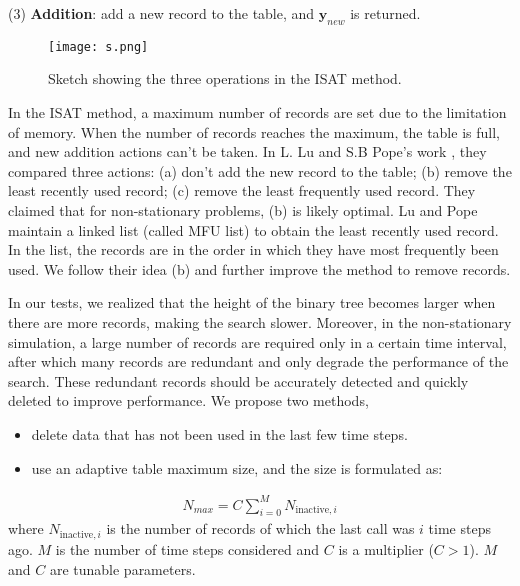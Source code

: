 (3) \textbf{Addition}: add a new record to the table, and $\mathbf{y}_{new}$ is returned.

\begin{figure}[htbp]
	\centering
	\texttt{[image: s.png]}
	\caption{Sketch showing the three operations in the ISAT method.}
	\label{ISAT_ALG}
\end{figure}

In the ISAT method, a maximum number of records are set due to the limitation of memory. When the number of records reaches the maximum, the table is full, and new addition actions can't be taken. In L. Lu and S.B Pope's work \cite{lu2009improved}, they compared three actions: (a) don't add the new record to the table; (b) remove the least recently used record; (c) remove the least frequently used record. They claimed that for non-stationary problems, (b) is likely optimal. Lu and Pope~\cite{lu2009improved}  maintain a linked list (called MFU list) to obtain the least recently used record. In the list, the records are in the order in which they have most frequently been used. We follow their idea (b) and further improve the method to remove records.

In our tests, we realized that the height of the binary tree becomes larger when there are more records, making the search slower. Moreover, in the non-stationary simulation, a large number of records are required only in a certain time interval, after which many records are redundant and only degrade the performance of the search. These redundant records should be accurately detected and quickly deleted to improve performance. We propose two methods,
\begin{itemize}
	\item delete data that has not been used in the last few time steps.
	\item use an adaptive table maximum size, and the size is formulated as:
\end{itemize}
\begin{align}
	N_{max} = C \sum_{i=0}^M  N_{\text{inactive},i}  \label{eq:adap}
\end{align}
where $ N_{\text{inactive},i}$ is the number of records of which the last call was $i$ time steps ago. $M$ is the number of time steps considered and $C$ is a multiplier ($C>1$). $M$ and $C$ are tunable parameters.


